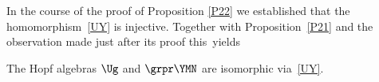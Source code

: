 In the course of the proof of Proposition \ref{P22} we established that
the homomorphism~\eqref{UY} is injective.
Together with Proposition~\ref{P21}
and the observation made just after its proof this~yields

\begin{Theorem}\label{T18}The Hopf algebras $\Ug$ and $\grpr\YMN$ are isomorphic via~\eqref{UY}.
\end{Theorem}
